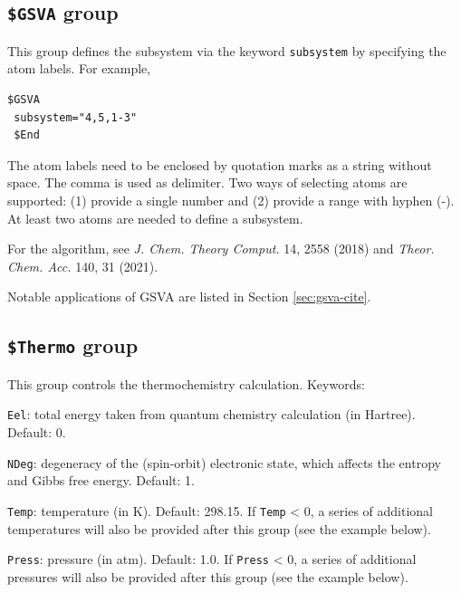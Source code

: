 \documentclass[12pt,english]{extarticle}
\begin{document}
\subsection{\texttt{\$GSVA} group} \label{sec:inp-gsva}

This group defines the subsystem via the keyword \verb|subsystem| by specifying the atom labels.
For example,
\begin{Verbatim}[frame=single]
 $GSVA
 subsystem="4,5,1-3"
 $End
\end{Verbatim}

The atom labels need to be enclosed by quotation marks as a string without space. The comma is used as delimiter. Two ways of selecting atoms are supported: (1) provide a single number and (2) provide a range with hyphen (-). At least two atoms are needed to define a subsystem.

For the algorithm, see \textit{J. Chem. Theory Comput.} 14, 2558 (2018) and \textit{Theor. Chem. Acc.} 140, 31 (2021).

Notable applications of GSVA are listed in Section \ref{sec:gsva-cite}.

\subsection{\texttt{\$Thermo} group} \label{sec:inp-thermo}

This group controls the thermochemistry calculation. Keywords:

\bigskip{}
\verb|Eel|: total energy taken from quantum chemistry calculation (in Hartree). Default: 0.

\bigskip{}
\verb|NDeg|: degeneracy of the (spin-orbit) electronic state, which affects the entropy and Gibbs free energy. Default: 1.

\bigskip{}
\verb|Temp|: temperature (in K). Default: 298.15. If \verb|Temp| < 0, a series of additional temperatures will also be provided after this group (see the example below).

\bigskip{}
\verb|Press|: pressure (in atm). Default: 1.0. If \verb|Press| < 0, a series of additional pressures will also be provided after this group (see the example below).
\end{document}
